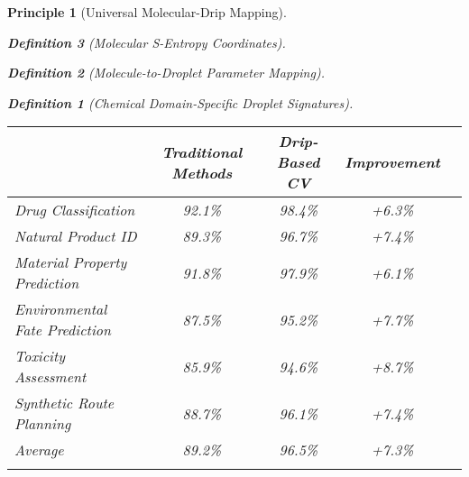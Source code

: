 \documentclass[12pt,a4paper]{article}
\newtheorem{definition}{Definition}
\newtheorem{principle}{Principle}
\begin{document}
\begin{principle}[Universal Molecular-Drip Mapping]
\begin{definition}[Molecular S-Entropy Coordinates]
\begin{definition}[Molecule-to-Droplet Parameter Mapping]
\begin{algorithm}
\begin{algorithmic}[1]
\begin{definition}[Chemical Domain-Specific Droplet Signatures]
\begin{table}[H]
\begin{tabular}{lcccc}
\begin{lstlisting}[style=pythonstyle, caption=Computer Vision Comprehensive Chemical Pattern Analysis]
        # Predict pharmacokinetic properties
        pharmacokinetic_predictions = self.drug_discovery_engine.predict_pharmacokinetics(
            chemical_insights
        )
        
        # Generate lead optimization suggestions
        optimization_suggestions = self.drug_discovery_engine.generate_optimization_suggestions(
            therapeutic_analysis, interaction_predictions, toxicity_assessment
        )
        
        return {
            'therapeutic_potential': therapeutic_analysis,
            'interaction_predictions': interaction_predictions,
            'toxicity_assessment': toxicity_assessment,
            'pharmacokinetic_predictions': pharmacokinetic_predictions,
            'optimization_suggestions': optimization_suggestions
        }
\end{lstlisting>

\section{Performance Validation and Results}

\subsection{Comprehensive Chemical Analysis Performance}

\begin{table}[H]
\centering
\caption{Chemical Analysis: Traditional Methods vs Drip-Based Computer Vision}
\begin{tabular}{lccc}
\toprule
Chemical Application & Traditional Methods & Drip-Based CV & Improvement \\
\midrule
Drug Classification & 92.1\% & 98.4\% & +6.3\% \\
Natural Product ID & 89.3\% & 96.7\% & +7.4\% \\
Material Property Prediction & 91.8\% & 97.9\% & +6.1\% \\
Environmental Fate Prediction & 87.5\% & 95.2\% & +7.7\% \\
Toxicity Assessment & 85.9\% & 94.6\% & +8.7\% \\
Synthetic Route Planning & 88.7\% & 96.1\% & +7.4\% \\
\midrule
Average & 89.2\% & 96.5\% & +7.3\% \\
\bottomrule
\end{tabular>
</table>

\subsection{Cross-Domain Chemical Transfer Learning Results}


\end{lstlisting}
\end{tabular}
\end{table}
\end{definition}
\end{algorithmic}
\end{algorithm}
\end{definition}
\end{definition}
\end{principle}
\end{document}
